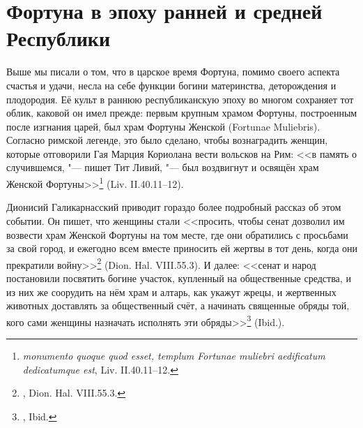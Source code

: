 \chapter{Фортуна в эпоху ранней и средней Республики\label{ChapterEarlyRepublic}}


Выше мы писали о том, что в царское время Фортуна, помимо своего аспекта счастья и удачи, несла на себе функции богини материнства, деторождения и плодородия. Её культ в раннюю республиканскую эпоху во многом сохраняет тот облик, каковой он имел прежде: первым крупным храмом Фортуны, построенным после изгнания царей, был храм Фортуны Женской (Fortunae Muliebris). Согласно римской легенде, это было сделано, чтобы вознаградить женщин, которые отговорили Гая Марция Кориолана вести вольсков на Рим: <<в память о случившемся, "--- пишет Тит Ливий, "--- был воздвигнут и освящён храм Женской Фортуны>>\footnote{\textit{monumento quoque quod esset, templum Fortunae muliebri aedificatum dedicatumque est}, Liv. II.40.11--12.} (Liv. II.40.11--12). 

Дионисий Галикарнасский приводит гораздо более подробный рассказ об этом событии. Он пишет, что женщины стали <<просить, чтобы сенат дозволил им возвести храм Женской Фортуны на том месте, где они обратились с просьбами за свой город, и ежегодно всем вместе приносить ей жертвы в тот день, когда они прекратили войну>>\footnote{, Dion. Hal. VIII.55.3.} (Dion. Hal. VIII.55.3). И далее: <<сенат и народ постановили посвятить богине участок, купленный на общественные средства, и из них же соорудить на нём храм и алтарь, как укажут жрецы, и жертвенных животных доставлять за общественный счёт, а начинать священные обряды той, кого сами женщины назначать исполнять эти обряды>>\footnote{, Ibid.} (Ibid.). 

